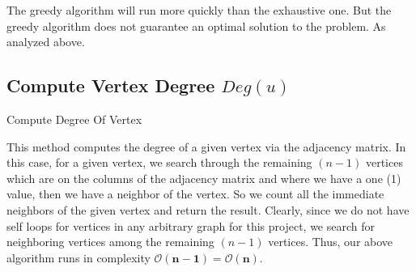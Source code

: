\documentclass[longpaper, english, final, times]{revdetua}
\begin{document}
		The greedy algorithm will run more quickly than the exhaustive one. But the greedy algorithm does not guarantee an optimal solution to the problem. As analyzed above.
		
		\subsection{Compute Vertex Degree $Deg(u)$}
			\begin{algorithm}
				\caption{Compute Degree Of Vertex}
				\label{algorithm:GetVertexDegree}
				\DontPrintSemicolon
				
				
				
				
			\end{algorithm}
				
			This method computes the degree of a given vertex via the adjacency matrix. In this case, for a given vertex, we search through the remaining $(n-1)$ vertices which are on the columns of the adjacency matrix and where we have a one (1) value, then we have a neighbor of the vertex. So we count all the immediate neighbors of the given vertex and return the result. Clearly, since we do not have self loops for vertices in any arbitrary graph for this project, we search for neighboring vertices among the remaining $(n-1)$ vertices. Thus, our above algorithm runs in complexity $\mathbf{\mathcal{O}(n-1)}=\mathbf{\mathcal{O}(n)}$. 
		
\end{document}
